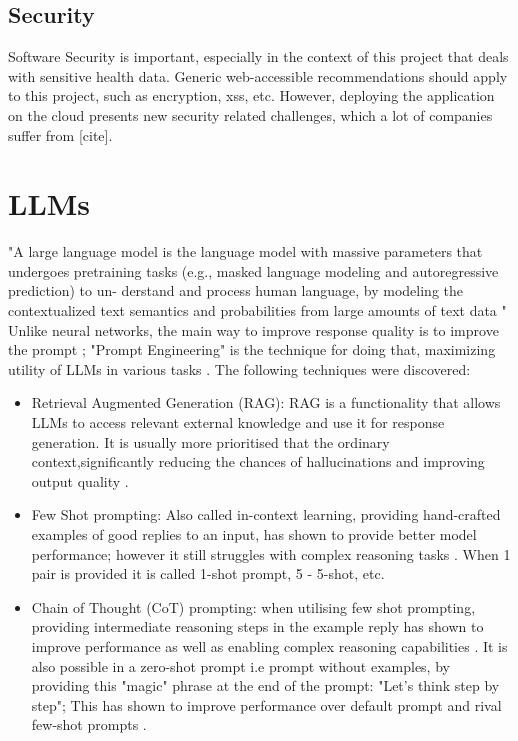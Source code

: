 \subsection{Security}
Software Security is important, especially in the context of this project that deals with sensitive health data. Generic web-accessible recommendations should apply to this project, such as encryption, xss, etc. However, deploying the application on the cloud presents new security related challenges, which a lot of companies suffer from [cite]. 
\section{LLMs}
"A large language model is the language model with massive
parameters that undergoes pretraining tasks (e.g., masked
language modeling and autoregressive prediction) to un-
derstand and process human language, by modeling the
contextualized text semantics and probabilities from large
amounts of text data " \cite{Yao2023ASO}
Unlike neural networks, the main way to improve response quality is to improve the prompt \cite{Liu2021PretrainPA}; "Prompt Engineering" is the technique for doing that, maximizing utility of LLMs in various tasks \cite{zhou2023large}. The following techniques were discovered:
\begin{itemize}
   \item Retrieval Augmented Generation (RAG): RAG is a functionality that allows LLMs to access relevant external knowledge and use it for response generation. It is usually more prioritised that the ordinary context,significantly reducing the chances of hallucinations and improving output quality \cite{gao2024retrievalaugmented}.
   \item Few Shot prompting: Also called in-context learning, providing hand-crafted examples of good replies to an input, has shown to provide better model performance; however it still struggles with complex reasoning tasks \cite{brown2020language, min2022rethinking}. When 1 pair is provided it is called 1-shot prompt, 5 - 5-shot, etc. 
   \item Chain of Thought (CoT) prompting: when utilising few shot prompting, providing intermediate reasoning steps in the example reply has shown to improve performance as well as enabling complex reasoning capabilities \cite{wei2023chainofthought}. It is also possible in a zero-shot prompt i.e prompt without examples, by providing this "magic" phrase at the end of the prompt: "Let's think step by step"; This has shown to improve performance over default prompt and rival few-shot prompts \cite{kojima2023large}.
\end{itemize}
